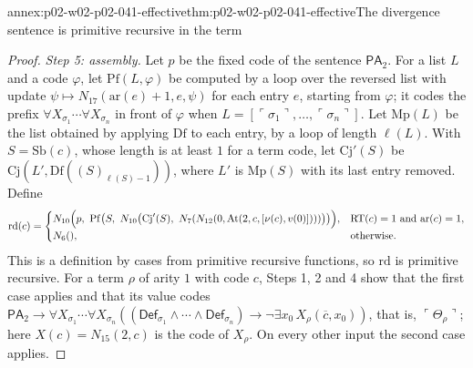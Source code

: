 \begin{annexitem}{annex:p02-w02-p02-041-effective}{thm:p02-w02-p02-041-effective}{The divergence sentence is primitive recursive in the term}
\begin{proof}
\emph{Step 5: assembly.}  Let \(p\) be the fixed code of the sentence
\(\mathsf{PA}_2\).  For a list \(L\) and a code \(\varphi\), let
\(\mathrm{Pf}(L,\varphi)\) be computed by a loop over the reversed list with
update \(\psi\mapsto N_{17}(\mathrm{ar}(e)+1,e,\psi)\) for each entry \(e\),
starting from \(\varphi\); it codes the prefix
\(\forall X_{\sigma_1}\cdots\forall X_{\sigma_n}\) in front of \(\varphi\) when
\(L=[\ulcorner\sigma_1\urcorner,\ldots,\ulcorner\sigma_n\urcorner]\).  Let
\(\mathrm{Mp}(L)\) be the list obtained by applying \(\mathrm{Df}\) to each
entry, by a loop of length \(\ell(L)\).  With \(S=\mathrm{Sb}(c)\), whose
length is at least \(1\) for a term code, let \(\mathrm{Cj}'(S)\) be
\(\mathrm{Cj}(L',\mathrm{Df}((S)_{\ell(S)-1}))\), where \(L'\) is
\(\mathrm{Mp}(S)\) with its last entry removed.  Define
\[
 \mathrm{rd}(c)=\begin{cases}
 N_{10}\Bigl(p,\ \mathrm{Pf}\bigl(S,\ N_{10}\bigl(\mathrm{Cj}'(S),\
   N_7(N_{12}(0,\mathrm{At}(2,c,[\nu(c),v(0)])))\bigr)\bigr)\Bigr),
 &\mathrm{RT}(c)=1\text{ and }\mathrm{ar}(c)=1,\\
 N_6(),&\text{otherwise}.
 \end{cases}
\]
This is a definition by cases from primitive recursive functions, so
\(\mathrm{rd}\) is primitive recursive.  For a term \(\rho\) of arity \(1\)
with code \(c\), Steps 1, 2 and 4 show that the first case applies and that
its value codes
\(\mathsf{PA}_2\to\forall X_{\sigma_1}\cdots\forall X_{\sigma_n}((\mathsf{Def}_{\sigma_1}\land\cdots\land\mathsf{Def}_{\sigma_n})\to\neg\exists x_0\,X_\rho(\overline c,x_0))\),
that is, \(\ulcorner\Theta_\rho\urcorner\); here \(X(c)=N_{15}(2,c)\) is the code of
\(X_\rho\).  On every other input the second case applies.
\end{proof}
\end{annexitem}

